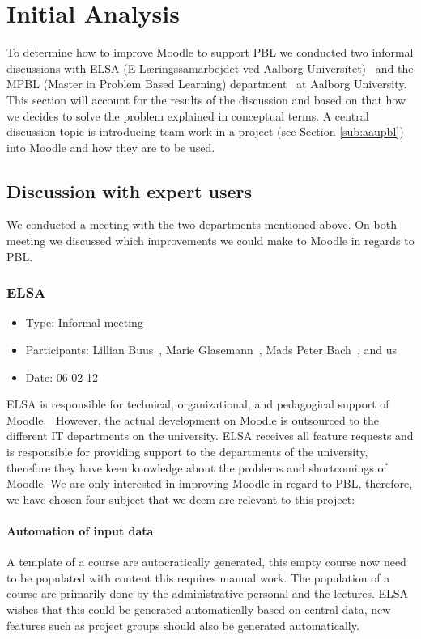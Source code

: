 \section{Initial Analysis}
\label{sec:initialAnalysis}
To determine how to improve Moodle to support PBL we conducted two informal discussions with  ELSA (E-Læringssamarbejdet ved Aalborg Universitet)~\cite{elsa} and the MPBL (Master in Problem Based Learning) department~\cite{mpbl} at Aalborg University.
This section will account for the results of the discussion and based on that how we decides to solve the problem explained in conceptual terms.
A central discussion topic is introducing team work in a project (see Section \ref{sub:aaupbl}) into Moodle and how they are to be used.     

\subsection{Discussion with expert users}  
\label{sub:expertUsers} 
We conducted a meeting with the two departments mentioned above. On both meeting we discussed which improvements we could make to Moodle in regards to PBL.  

\subsubsection{ELSA}
\label{sub:elsaInterview}
\begin{itemize}
	\item Type: Informal meeting
	\item Participants: Lillian Buus~\cite{lillian}, Marie Glasemann~\cite{marie}, Mads Peter Bach~\cite{mads}, and us 
	\item Date: 06-02-12
\end{itemize}
ELSA is responsible for technical, organizational, and pedagogical support of Moodle.~\cite{elsa} 
However, the actual development on Moodle is outsourced to the different IT departments on the university. 
ELSA receives all feature requests and is responsible for providing support to the departments of the university, therefore they have keen knowledge about the problems and shortcomings of Moodle. 
We are only interested in improving Moodle in regard to PBL, therefore, we have chosen four subject that we deem are relevant to this project:

\paragraph{Automation of input data} A template of a course are autocratically generated, this empty course now need to be populated with content this requires manual work. 
The population of a course are primarily done by the administrative personal and the lectures. 
ELSA wishes that this could be generated automatically based on central data, new features such as project groups should also be generated automatically.     
